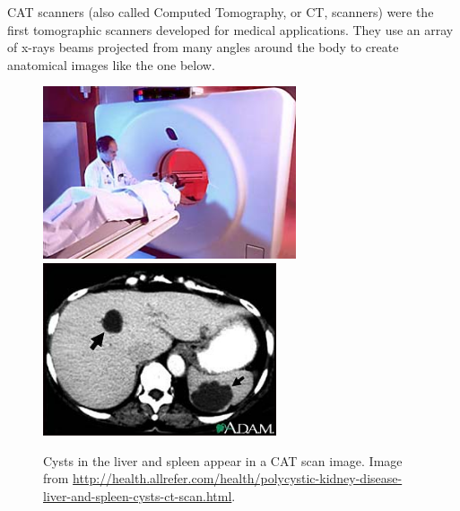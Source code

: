 CAT scanners (also called Computed Tomography, or CT, scanners) were the first tomographic scanners developed for medical applications.  They use an array of x-rays beams projected from many angles around the body to create anatomical images like the one below.
\begin{figure}[!htb]
	\centering
	\includegraphics[height=2.0in]{./figures/Topic10/Fig10-7a.jpg}
\includegraphics[height=2.0in]{./figures/Topic10/Fig10-7b.jpg}
	\caption{Cysts in the liver and spleen appear in a CAT scan image.  Image from \href{http://health.allrefer.com/health/polycystic-kidney-disease-liver-and-spleen-cysts-ct-scan.html}{http://health.allrefer.com/health/polycystic-kidney-disease-liver-and-spleen-cysts-ct-scan.html}.}
	\label{Fig10-7}
\end{figure}

